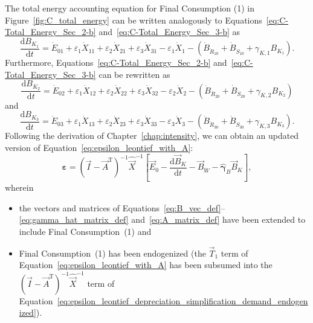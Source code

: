 The total energy accounting equation for Final Consumption (1)
in Figure~\ref{fig:C_total_energy} can be written 
analogously to Equations~\ref{eq:C-Total_Energy_Sec_2-b}
and~\ref{eq:C-Total_Energy_Sec_3-b} as
%
\begin{equation} \label{eq:C-Total_Energy_Sec_1-unfinished}
	\frac{\mathrm{d}B_{K_{1}}}{\mathrm{d}t}
	= \dot{E}_{01}
	+ \varepsilon_{1} \dot{X}_{11}
	+ \varepsilon_{2} \dot{X}_{21}
	+ \varepsilon_{3} \dot{X}_{31}
	- \varepsilon_{1} \dot{X}_{1}
	- \left( \dot{B}_{\dot{R}_{10}} 
							+ \dot{B}_{\dot{S}_{10}}
							+ \gamma_{K,1} B_{K_{1}}
							\right).
\end{equation}
%
Furthermore, Equations~\ref{eq:C-Total_Energy_Sec_2-b}
and~\ref{eq:C-Total_Energy_Sec_3-b}
can be rewritten as 
%
\begin{equation} \label{eq:C-Total_Energy_Sec_2-unfinished}
	\frac{\mathrm{d}B_{K_{2}}}{\mathrm{d}t}
	= \dot{E}_{02}
	+ \varepsilon_{1} \dot{X}_{12}
	+ \varepsilon_{2} \dot{X}_{22}
	+ \varepsilon_{3} \dot{X}_{32}
	- \varepsilon_{2} \dot{X}_{2}
	- \left( \dot{B}_{\dot{R}_{20}} 
							+ \dot{B}_{\dot{S}_{20}}
							+ \gamma_{K,2} B_{K_{2}}
							\right)
\end{equation}
%
and
%
\begin{equation} \label{eq:C-Total_Energy_Sec_3-unfinished}
	\frac{\mathrm{d}B_{K_{3}}}{\mathrm{d}t}
	= \dot{E}_{03}
	+ \varepsilon_{1} \dot{X}_{13}
	+ \varepsilon_{2} \dot{X}_{23}
	+ \varepsilon_{3} \dot{X}_{33}
	- \varepsilon_{3} \dot{X}_{3}
	- \left( \dot{B}_{\dot{R}_{30}} 
							+ \dot{B}_{\dot{S}_{30}}
							+ \gamma_{K,3} B_{K_{3}}
							\right).
\end{equation}
%
Following the derivation of Chapter~\ref{chap:intensity},
we can obtain an updated version 
of Equation~\ref{eq:epsilon_leontief_with_A}:
%
\begin{equation} \label{eq:epsilon_leontief_depreciation_simplification_demand_endogenized}
	\boldsymbol{\varepsilon} 
	= {(\vec{I} - \vec{A}^{\mathrm{T}})}^{-1}\hat{\vec{X}}^{-1}
		\left[\vec{E}_{0} 
				- \frac{\mathrm{d}\vec{B}_{K}}{\mathrm{d}t} 
				- \vec{B}_{\dot{W}}
				- \hat{\boldsymbol{\gamma}}_{B}\vec{B}_{K}
		\right],
\end{equation}
%
wherein 
%
\begin{itemize}
	\item{the vectors and matrices of Equations~\ref{eq:B_vec_def}--\ref{eq:gamma_hat_matrix_def}
	and~\ref{eq:A_matrix_def} have been extended to include Final Consumption~(1) and}
	
	\item{Final Consumption~(1) has been endogenized
	(the $\vec{T}_{1}$ term of Equation~\ref{eq:epsilon_leontief_with_A}
	has been subsumed into the 
	${(\vec{I} - \vec{A}^{\mathrm{T}})}^{-1}\hat{\vec{X}}^{-1}$
	term of Equation~\ref{eq:epsilon_leontief_depreciation_simplification_demand_endogenized}).}
\end{itemize}

